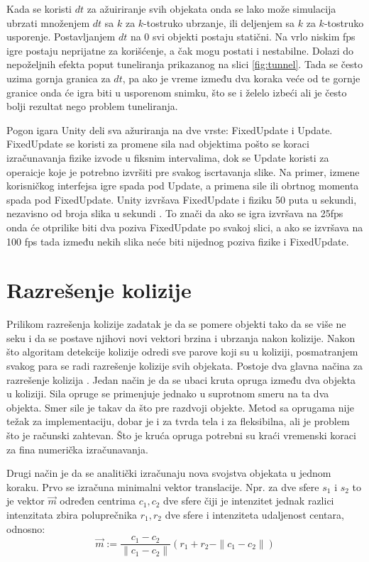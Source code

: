 \documentclass[12pt,oneside]{memoir}
\begin{document}
Kada se koristi $dt$ za ažuiriranje svih objekata onda se lako može simulacija ubrzati množenjem $dt$ 
sa $k$ za $k$-tostruko ubrzanje, ili deljenjem sa $k$ za $k$-tostruko usporenje. Postavljanjem $dt$ na 0 svi 
objekti postaju statični. 
Na vrlo niskim fps igre postaju neprijatne za korišćenje, a čak mogu postati i nestabilne. Dolazi do nepoželjnih efekta 
poput tuneliranja prikazanog na slici \ref{fig:tunnel}. Tada se često uzima gornja granica za $dt$, pa 
ako je vreme između dva koraka veće od te gornje granice onda će igra biti u usporenom snimku, što se i želelo izbeći 
ali je često bolji rezultat nego problem tuneliranja.

Pogon igara Unity deli sva ažuriranja na dve vrste: FixedUpdate i Update. 
FixedUpdate se koristi za promene sila nad objektima pošto se koraci izračunavanja fizike izvode u fiksnim intervalima, 
dok se Update koristi za operaicje koje je potrebno izvršiti pre svakog iscrtavanja slike. 
Na primer, izmene korisničkog interfejsa igre spada pod Update, a primena sile ili obrtnog momenta spada pod FixedUpdate.
Unity izvršava FixedUpdate i fiziku 50 puta u sekundi, nezavisno od broja slika u sekundi \cite{unity}.
To znači da ako se igra izvršava na 25fps onda će otprilike biti dva poziva FixedUpdate po svakoj slici,
a ako se izvršava na 100 fps tada između nekih slika neće biti nijednog poziva fizike i FixedUpdate.

\section{Razrešenje kolizije}
\label{sec:razresenje}

Prilikom razrešenja kolizije zadatak je da se pomere objekti tako da se više ne seku i
da se postave njihovi novi vektori brzina i ubrzanja nakon kolizije.
Nakon što algoritam detekcije kolizije odredi sve parove koji su u koliziji, 
posmatranjem svakog para se radi razrešenje kolizije svih objekata.
Postoje dva glavna načina za razrešenje kolizija \cite{Moore}.
Jedan način je da se ubaci kruta opruga između dva objekta u koliziji.
Sila opruge se primenjuje jednako u suprotnom smeru na ta dva objekta.
Smer sile je takav da što pre razdvoji objekte. Metod sa oprugama nije težak 
za implementaciju, dobar je i za tvrda tela i za fleksibilna, ali je problem što je 
računski zahtevan. Što je kruća opruga potrebni su kraći vremenski koraci za fina 
numerička izračunavanja.

Drugi način je da se analitički izračunaju nova svojstva objekata u jednom koraku.
Prvo se izračuna minimalni vektor translacije. Npr. za dve sfere $s_1$ i $s_2$ to je vektor $\vec{m}$
određen centrima $c_1, c_2$ dve sfere čiji je intenzitet jednak razlici intenzitata zbira poluprečnika
$r_1, r_2$ dve sfere i intenziteta udaljenost centara, odnosno:
\begin{equation}
	\label{eq:razresenje2}
	 \vec{m} := \frac{{c_1 - c_2}} {\|{c_1 - c_2}\|} 
	(r_1 + r_2 - \| {c_1 - c_2} \| ) 
\end{equation}
\end{document}
